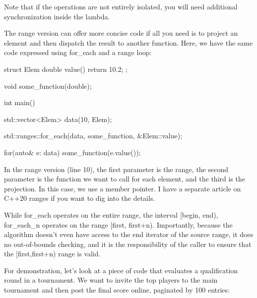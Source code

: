 Note that if the operations are not entirely isolated, you will need additional synchronization inside the lambda.

The range version can offer more concise code if all you need is to project an element and then dispatch the result to another function. Here, we have the same code expressed using for\_each and a range loop:

\begin{box-note}
\begin{cppcode}
struct Elem {
    double value() { return 10.2; }
};

void some_function(double);

int main() {
    std::vector<Elem> data(10, Elem{});
    
    std::ranges::for_each(data, some_function, &Elem::value);

    for(auto& e: data) {
        some_function(e.value());
    }
}
\end{cppcode}
\end{box-note}

In the range version (line 10), the first parameter is the range, the second parameter is the function we want to call for each element, and the third is the projection. In this case, we use a member pointer. I have a separate article on C++20 ranges if you want to dig into the details.


While for\_each operates on the entire range, the interval [begin, end), for\_each\_n operates on the range [first, first+n). Importantly, because the algorithm doesn’t even have access to the end iterator of the source range, it does no out-of-bounds checking, and it is the responsibility of the caller to ensure that the [first,first+n) range is valid.

For demonstration, let’s look at a piece of code that evaluates a qualification round in a tournament. We want to invite the top players to the main tournament and then post the final score online, paginated by 100 entries:

